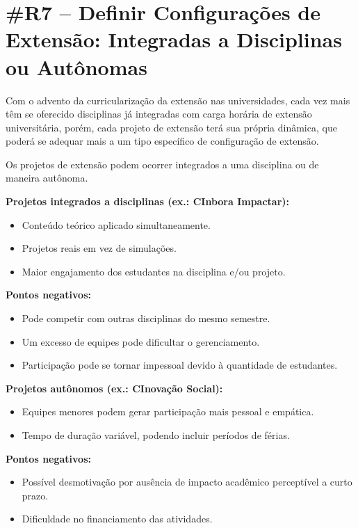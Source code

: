 \section*{\#R7 – Definir Configurações de Extensão: Integradas a Disciplinas ou Autônomas}

Com o advento da curricularização da extensão nas universidades, cada vez mais têm se oferecido disciplinas já integradas com carga horária de extensão universitária, porém, cada projeto de extensão terá sua própria dinâmica, que poderá se adequar mais a um tipo específico de configuração de extensão.

Os projetos de extensão podem ocorrer integrados a uma disciplina ou de maneira autônoma.

\textbf{Projetos integrados a disciplinas (ex.: CInbora Impactar):}
\begin{itemize}
    \item Conteúdo teórico aplicado simultaneamente.
    \item Projetos reais em vez de simulações.
    \item Maior engajamento dos estudantes na disciplina e/ou projeto.
\end{itemize}

\textbf{Pontos negativos:}
\begin{itemize}
    \item Pode competir com outras disciplinas do mesmo semestre.
    \item Um excesso de equipes pode dificultar o gerenciamento.
    \item Participação pode se tornar impessoal devido à quantidade de estudantes.
\end{itemize}

\textbf{Projetos autônomos (ex.: CInovação Social):}
\begin{itemize}
    \item Equipes menores podem gerar participação mais pessoal e empática.
    \item Tempo de duração variável, podendo incluir períodos de férias.
\end{itemize}

\textbf{Pontos negativos:}
\begin{itemize}
    \item Possível desmotivação por ausência de impacto acadêmico perceptível a curto prazo.
    \item Dificuldade no financiamento das atividades.
\end{itemize}

